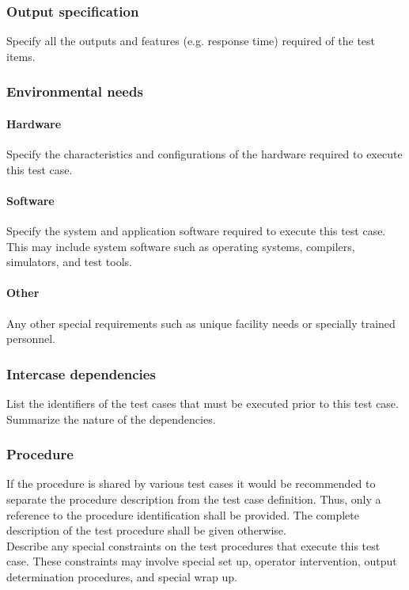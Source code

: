 \documentclass[DM,lsstdraft,STS,toc]{lsstdoc}
\begin{document}
\subsubsection{Output specification \label{sect:tcoutput}}
Specify all the outputs and features (e.g. response time) required of the test items.

\subsubsection{Environmental needs \label{sect:tcenvironment}}
\paragraph{Hardware \label{sect:tchw}}
Specify the characteristics and configurations of the hardware required to execute this test case.
\paragraph{Software \label{sect:tcsw}}
Specify the system and application software required to execute this test case. This may include system software such as operating
systems, compilers, simulators, and test tools.
\paragraph{Other \label{sect:tcother}}
Any other special requirements such as unique facility needs or specially trained personnel.

\subsubsection{Intercase dependencies \label{interface_dependencies}}
List the identifiers of the test cases that must be executed prior to this test case. Summarize the nature of the dependencies.

\subsubsection{Procedure \label{procedures}}
If the procedure is shared by various test cases it would be recommended to separate the procedure description from the test
case definition. Thus, only a reference to the procedure identification shall be provided. The complete description of
the test procedure shall be given otherwise. \\

Describe any special constraints on the test procedures that execute this test case. These constraints may involve special set
up, operator intervention, output determination procedures, and special wrap up.
\end{document}
